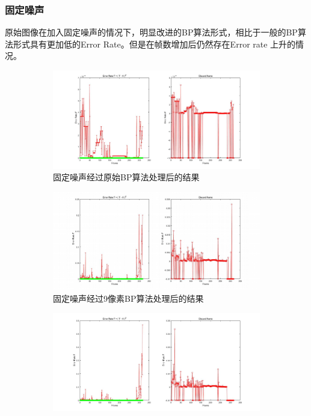 \documentclass{article}
\newcounter{sub}
\begin{document}
\subsubsection{固定噪声}%
\label{ssub:固定噪声}

原始图像在加入固定噪声的情况下，明显改进的BP算法形式，相比于一般的BP算法形式具有更加低的Error Rate。但是在帧数增加后仍然存在Error rate 上升的情况。

\begin{figure}[htpb]
	\centering
	\begin{subfigure}[htpb]{.45\linewidth}
		\centering
		\includegraphics[width=\linewidth]{fixed-5.png}
		\caption{固定噪声经过原始BP算法处理后的结果}
		\label{fig:固定噪声经过原始BP算法处理后的结果}
	\end{subfigure}
	\quad
	\begin{subfigure}[htpb]{.45\linewidth}
		\centering
		\includegraphics[width=\linewidth]{fixed-9.png}
		\caption{固定噪声经过9像素BP算法处理后的结果}
		\label{fig:固定噪声经过9像素BP算法处理后的结果}
	\end{subfigure}
	\quad
	\begin{subfigure}[htpb]{.45\linewidth}
		\centering
		\includegraphics[width=\linewidth]{fixed-13.png}

\end{subfigure}
\end{figure}
\end{document}
